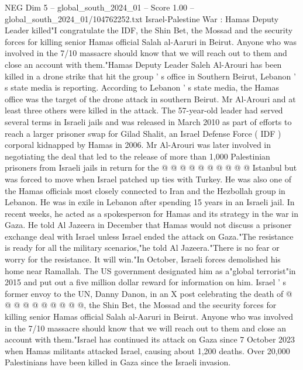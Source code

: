 \begin{textsample}{NEG Dim 5 – global\_south\_2024\_01 – Score 1.00 – global\_south\_2024\_01/104762252.txt}  \label{ex:f5_neg_447}
Israel-Palestine War : Hamas Deputy Leader killed"I congratulate the IDF, the Shin Bet, the Mossad and the security forces for killing senior Hamas official Salah al-Aaruri in Beirut.
Anyone who was involved in the 7/10 massacre should know that we will reach out to them and close an account with them."Hamas Deputy Leader Saleh Al-Arouri has been killed in a drone strike that hit the group ' s office in Southern Beirut, Lebanon ' s state media is reporting.
According to Lebanon ' s state media, the Hamas office was the target of the drone attack in southern Beirut.
Mr Al-Arouri and at least three others were killed in the attack.
The 57-year-old leader had served several terms in Israeli jails and was released in March 2010 as part of efforts to reach a larger prisoner swap for Gilad Shalit, an Israel Defense Force ( IDF ) corporal kidnapped by Hamas in 2006.
Mr Al-Arouri was later involved in negotiating the deal that led to the release of more than 1,000 Palestinian prisoners from Israeli jails in return for the @ @ @ @ @ @ @ @ @ @ Istanbul but was forced to move when Israel patched up ties with Turkey.
He was also one of the Hamas officials most closely connected to Iran and the Hezbollah group in Lebanon.
He was in exile in Lebanon after spending 15 years in an Israeli jail.
In recent weeks, he acted as a spokesperson for Hamas and its strategy in the war in Gaza.
He told Al Jazeera in December that Hamas would not discuss a prisoner exchange deal with Israel unless Israel ended the attack on Gaza."The resistance is ready for all the military scenarios,"he told Al Jazeera."There is no fear or worry for the resistance.
It will win."In October, Israeli forces demolished his home near Ramallah.
The US government designated him as a"global terrorist"in 2015 and put out a five million dollar reward for information on him.
Israel ' s former envoy to the UN, Danny Danon, in an X post celebrating the death of @ @ @ @ @ @ @ @ @ @, the Shin Bet, the Mossad and the security forces for killing senior Hamas official Salah al-Aaruri in Beirut.
Anyone who was involved in the 7/10 massacre should know that we will reach out to them and close an account with them."Israel has continued its attack on Gaza since 7 October 2023 when Hamas militants attacked Israel, causing about 1,200 deaths.
Over 20,000 Palestinians have been killed in Gaza since the Israeli invasion.

\end{textsample}
